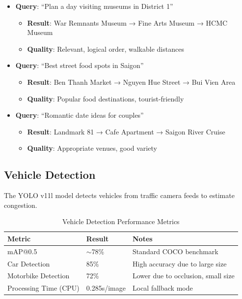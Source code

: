 \begin{itemize}[noitemsep]
    \item \textbf{Query}: ``Plan a day visiting museums in District 1''
    \begin{itemize}[noitemsep]
        \item \textbf{Result}: War Remnants Museum → Fine Arts Museum → HCMC Museum
        \item \textbf{Quality}: \checkmark{} Relevant, logical order, walkable distances
    \end{itemize}
    
    \item \textbf{Query}: ``Best street food spots in Saigon''
    \begin{itemize}[noitemsep]
        \item \textbf{Result}: Ben Thanh Market → Nguyen Hue Street → Bui Vien Area
        \item \textbf{Quality}: \checkmark{} Popular food destinations, tourist-friendly
    \end{itemize}
    
    \item \textbf{Query}: ``Romantic date ideas for couples''
    \begin{itemize}[noitemsep]
        \item \textbf{Result}: Landmark 81 → Cafe Apartment → Saigon River Cruise
        \item \textbf{Quality}: \checkmark{} Appropriate venues, good variety
    \end{itemize}
\end{itemize}

\subsection{Vehicle Detection}

The YOLO v11l model detects vehicles from traffic camera feeds to estimate congestion.

\begin{table}[H]
    \centering
    \renewcommand{\arraystretch}{1.3}
    \begin{tabularx}{\textwidth}{|p{4cm}|p{2.5cm}|X|}
        \hline
        \textbf{Metric} & \textbf{Result} & \textbf{Notes} \\
        \hline
        mAP@0.5 & $\sim$78\% & Standard COCO benchmark \\
        \hline
        Car Detection & 85\% & High accuracy due to large size \\
        \hline
        Motorbike Detection & 72\% & Lower due to occlusion, small size \\
        \hline
        Processing Time (CPU) & 0.285s/image & Local fallback mode \\
        \hline
    \end{tabularx}
    \caption{Vehicle Detection Performance Metrics}
\end{table}

